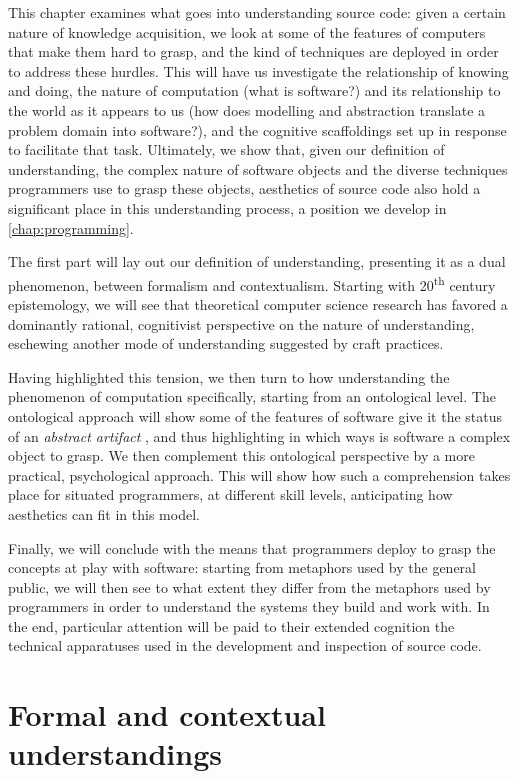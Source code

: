 This chapter examines what goes into understanding source code: given a certain nature of knowledge acquisition, we look at some of the features of computers that make them hard to grasp, and the kind of techniques are deployed in order to address these hurdles. This will have us investigate the relationship of knowing and doing, the nature of computation (what is software?) and its relationship to the world as it appears to us (how does modelling and abstraction translate a problem domain into software?), and the cognitive scaffoldings set up in response to facilitate that task. Ultimately, we show that, given our definition of understanding, the complex nature of software objects and the diverse techniques programmers use to grasp these objects, aesthetics of source code also hold a significant place in this understanding process, a position we develop in \ref{chap:programming}.

The first part will lay out our definition of understanding, presenting it as a dual phenomenon, between formalism and contextualism. Starting with 20\textsuperscript{th} century epistemology, we will see that theoretical computer science research has favored a dominantly rational, cognitivist perspective on the nature of understanding, eschewing another mode of understanding suggested by craft practices.

Having highlighted this tension, we then turn to how understanding the phenomenon of computation specifically, starting from an ontological level. The ontological approach will show some of the features of software give it the status of an \emph{abstract artifact} \citep{irmak_software_2012}, and thus highlighting in which ways is software a complex object to grasp. We then complement this ontological perspective by a more practical, psychological approach. This will show how such a comprehension takes place for situated programmers, at different skill levels, anticipating how aesthetics can fit in this model.

Finally, we will conclude with the means that programmers deploy to grasp the concepts at play with software: starting from metaphors used by the general public, we will then see to what extent they differ from the metaphors used by programmers in order to understand the systems they build and work with. In the end, particular attention will be paid to their extended cognition the technical apparatuses used in the development and inspection of source code.

\section{Formal and contextual understandings}
\label{sec:formal-contextual-understandings}


